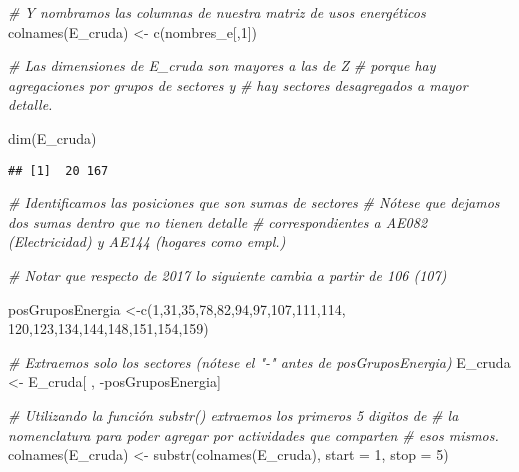 \documentclass[
]{article}
\newenvironment{Shaded}{\begin{snugshade}}{\end{snugshade}}
\newcommand{\AttributeTok}[1]{\textcolor[rgb]{0.77,0.63,0.00}{#1}}
\newcommand{\CommentTok}[1]{\textcolor[rgb]{0.56,0.35,0.01}{\textit{#1}}}
\newcommand{\DecValTok}[1]{\textcolor[rgb]{0.00,0.00,0.81}{#1}}
\newcommand{\FunctionTok}[1]{\textcolor[rgb]{0.00,0.00,0.00}{#1}}
\newcommand{\NormalTok}[1]{#1}
\newcommand{\OtherTok}[1]{\textcolor[rgb]{0.56,0.35,0.01}{#1}}
\newcommand{\SpecialCharTok}[1]{\textcolor[rgb]{0.00,0.00,0.00}{#1}}
\begin{document}
\begin{Shaded}
\begin{Highlighting}[]
\CommentTok{\# Y nombramos las columnas de nuestra matriz de usos energéticos}
\FunctionTok{colnames}\NormalTok{(E\_cruda) }\OtherTok{\textless{}{-}} \FunctionTok{c}\NormalTok{(nombres\_e[,}\DecValTok{1}\NormalTok{])}

\CommentTok{\# Las dimensiones de E\_cruda son mayores a las de Z}
\CommentTok{\# porque hay agregaciones por grupos de sectores y}
\CommentTok{\# hay sectores desagregados a mayor detalle.}

\FunctionTok{dim}\NormalTok{(E\_cruda)}
\end{Highlighting}
\end{Shaded}

\begin{verbatim}
## [1]  20 167
\end{verbatim}

\begin{Shaded}
\begin{Highlighting}[]
\CommentTok{\# Identificamos las posiciones que son sumas de sectores}
\CommentTok{\# Nótese que dejamos dos sumas dentro que no tienen detalle}
\CommentTok{\# correspondientes a AE082 (Electricidad) y AE144 (hogares como empl.)}

\CommentTok{\# Notar que respecto de 2017 lo siguiente cambia a partir de 106 (107)}

\NormalTok{posGruposEnergia }\OtherTok{\textless{}{-}}\FunctionTok{c}\NormalTok{(}\DecValTok{1}\NormalTok{,}\DecValTok{31}\NormalTok{,}\DecValTok{35}\NormalTok{,}\DecValTok{78}\NormalTok{,}\DecValTok{82}\NormalTok{,}\DecValTok{94}\NormalTok{,}\DecValTok{97}\NormalTok{,}\DecValTok{107}\NormalTok{,}\DecValTok{111}\NormalTok{,}\DecValTok{114}\NormalTok{,}
                      \DecValTok{120}\NormalTok{,}\DecValTok{123}\NormalTok{,}\DecValTok{134}\NormalTok{,}\DecValTok{144}\NormalTok{,}\DecValTok{148}\NormalTok{,}\DecValTok{151}\NormalTok{,}\DecValTok{154}\NormalTok{,}\DecValTok{159}\NormalTok{)}

\CommentTok{\# Extraemos solo los sectores (nótese el "{-}" antes de posGruposEnergia)}
\NormalTok{E\_cruda }\OtherTok{\textless{}{-}}\NormalTok{ E\_cruda[ , }\SpecialCharTok{{-}}\NormalTok{posGruposEnergia]}

\CommentTok{\# Utilizando la función substr() extraemos los primeros 5 digitos de}
\CommentTok{\# la nomenclatura para poder agregar por actividades que comparten}
\CommentTok{\# esos mismos.}
\FunctionTok{colnames}\NormalTok{(E\_cruda) }\OtherTok{\textless{}{-}} \FunctionTok{substr}\NormalTok{(}\FunctionTok{colnames}\NormalTok{(E\_cruda), }\AttributeTok{start =} \DecValTok{1}\NormalTok{, }\AttributeTok{stop =} \DecValTok{5}\NormalTok{)}


\end{Highlighting}
\end{Shaded}
\end{document}
